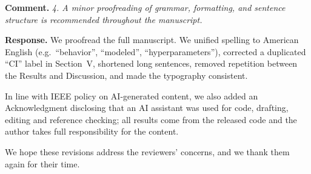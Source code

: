 \documentclass[11pt]{article}
\newcommand{\rc}[1]{\par\medskip\textbf{Comment.} \emph{#1}\par}
\newcommand{\rs}{\textbf{Response.} }
\begin{document}
\rc{4. A minor proofreading of grammar, formatting, and sentence structure is recommended throughout the manuscript.}

\rs We proofread the full manuscript. We unified spelling to American English (e.g.\ ``behavior'', ``modeled'', ``hyperparameters''), corrected a duplicated ``CI'' label in Section~V, shortened long sentences, removed repetition between the Results and Discussion, and made the typography consistent.

In line with IEEE policy on AI-generated content, we also added an Acknowledgment disclosing that an AI assistant was used for code, drafting, editing and reference checking; all results come from the released code and the author takes full responsibility for the content.

\medskip
We hope these revisions address the reviewers' concerns, and we thank them again for their time.
\end{document}
